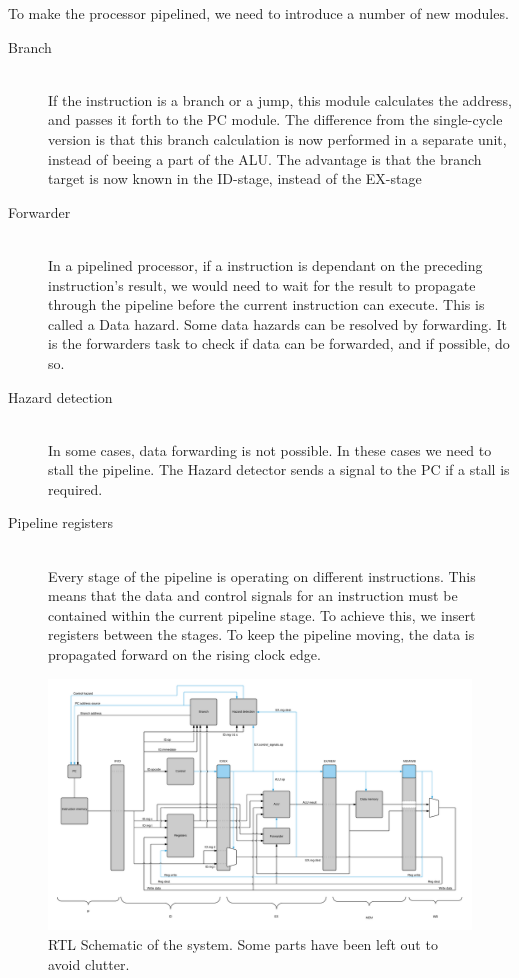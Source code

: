 To make the processor pipelined, we need to introduce a number of new modules.

\begin{description}
  \item[Branch] \hfill \\
  If the instruction is a branch or a jump, this module calculates the address, and passes it forth to the PC module. The difference from the single-cycle version is that this  branch calculation is now performed in a separate unit, instead of beeing a part of the ALU. The advantage is that the branch target is now known in the ID-stage, instead of the EX-stage 
  \item[Forwarder] \hfill \\
  In a pipelined processor, if a instruction is dependant on the preceding instruction's result, we would need to wait for the result to propagate through the pipeline before the current instruction can execute. This is called a Data hazard. Some data hazards can be resolved by forwarding. It is the forwarders task to check if data can be forwarded, and if possible, do so.
  \item[Hazard detection] \hfill \\
  In some cases, data forwarding is not possible. In these cases we need to stall the pipeline. The Hazard detector sends a signal to the PC if a stall is required.
  \item[Pipeline registers] \hfill \\
  Every stage of the pipeline is operating on different instructions. This means that the data and control signals for an instruction must be contained within the current pipeline stage. To achieve this, we insert registers between the stages. To keep the pipeline moving, the data is propagated forward on the rising clock edge. 
\end{description}

\begin{figure}[h!]
    \includegraphics[width=\linewidth]{img/toplel.png}
    \caption{RTL Schematic of the system. Some parts have been left out to avoid clutter.}
    \label{fig:toplevel}
\end{figure}


